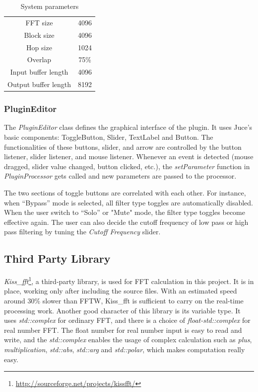 \documentclass{sig-alternate}
\begin{document}
        \begin{table}
            \centering
            \caption{System parameters}
            \label{tab:para}
            \begin{tabular}{ c | c }
                \hline
                FFT size & 4096 \\
                Block size & 4096 \\ 
                Hop size & 1024 \\ 
                Overlap & 75\% \\ 
                Input buffer length & 4096 \\ 
                Output buffer length & 8192 \\ 
                \hline
              \end{tabular}
        \end{table}

\subsubsection{PluginEditor}

The \textsl{PluginEditor} class defines the graphical interface of the plugin. It uses Juce’s basic components:  ToggleButton, Slider, TextLabel and Button. The functionalities of these buttons, slider, and arrow are controlled by the button listener, slider listener, and mouse listener. Whenever an event is detected (mouse dragged, slider value changed, button clicked, etc.), the \textsl{setParameter} function in \textsl{PluginProcessor} gets called and new parameters are passed to the processor. 

The two sections of toggle buttons are correlated with each other. For instance, when “Bypass” mode is selected, all filter type toggles are automatically disabled. When the user switch to “Solo” or "Mute" mode, the filter type toggles become effective again. The user can also decide the cutoff frequency of low pass or high pass filtering by tuning the \textsl{Cutoff Frequency} slider. 


\subsection{Third Party Library}

\textsl{Kiss\_fft}\footnote{\url{http://sourceforge.net/projects/kissfft/}}, a third-party library, is used for FFT calculation in this project. It is in place, working only after including the source files. With an estimated speed around 30\% slower than FFTW, Kiss\_fft is sufficient to carry on the real-time processing work. Another good character of this library is its variable type. It uses \textsl{std::complex} for ordinary FFT, and there is a choice of \textsl{float-std::complex} for real number FFT. The float number for real number input is easy to read and write, and the \textsl{std::complex} enables the usage of complex calculation such as \textsl{plus}, \textsl{multiplication}, \textsl{std::abs}, \textsl{std::arg} and \textsl{std::polar}, which makes computation really easy.
\end{document}
